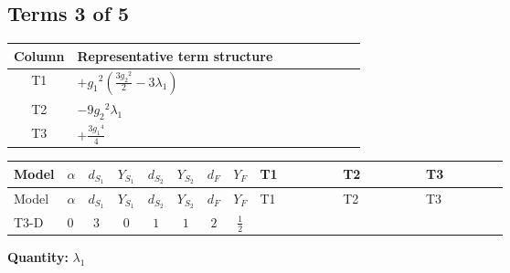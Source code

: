 \documentclass[8pt]{article}
\begin{document}
\begin{landscape}
\subsection*{Terms 3 of 5}
\begin{center}
\begin{tabular}{@{}c >{\raggedright\arraybackslash}p{0.82\linewidth}@{}}
\toprule
Column & Representative term structure \\
\midrule
T1 & \(\displaystyle +{g_1}^2 \left(\frac{3 {g_2}^2}{2}-3 {\lambda_1}\right)\) \\
\midrule
T2 & \(\displaystyle -9 {g_2}^2 {\lambda_1}\) \\
\midrule
T3 & \(\displaystyle +\frac{3 {g_1}^4}{4}\) \\
\midrule
\bottomrule
\end{tabular}
\end{center}
\smallskip
\tiny
\begin{longtable}{@{}llcccccc >{\raggedright\arraybackslash}p{0.21\linewidth} >{\raggedright\arraybackslash}p{0.21\linewidth} >{\raggedright\arraybackslash}p{0.21\linewidth}@{}}
\toprule
Model & $\alpha$ & $d_{S_1}$ & $Y_{S_1}$ & $d_{S_2}$ & $Y_{S_2}$ & $d_F$ & $Y_F$ & T1 & T2 & T3 \\
\midrule
\endfirsthead
\toprule
Model & $\alpha$ & $d_{S_1}$ & $Y_{S_1}$ & $d_{S_2}$ & $Y_{S_2}$ & $d_F$ & $Y_F$ & T1 & T2 & T3 \\
\midrule
\endhead
T3-D & $0$ & $3$ & $0$ & $1$ & $1$ & $2$ & $\frac{1}{2}$ & \scriptsize\adjustbox{max width=\linewidth}{$\begin{gathered} +{g_1}^2 \left(\frac{3 {g_2}^2}{2}-3 {\lambda_1}\right)\end{gathered}$} & \scriptsize\adjustbox{max width=\linewidth}{$\begin{gathered} -9 {g_2}^2 {\lambda_1}\end{gathered}$} & \scriptsize\adjustbox{max width=\linewidth}{$\begin{gathered} +\frac{3 {g_1}^4}{4}\end{gathered}$} \\
\midrule
\bottomrule
\end{longtable}
\clearpage
\noindent\textbf{Quantity: }$\lambda_1$\par\smallskip

\end{landscape}
\end{document}
